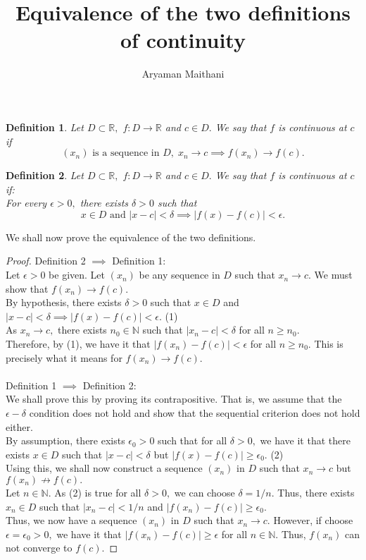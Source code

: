 \documentclass{article}
\title{Equivalence of the two definitions of continuity}
\author{Aryaman Maithani}
\date{}
\newtheorem{defn}{Definition}
\begin{document}
\maketitle

\hrulefill

\vspace{0.5cm}
\begin{defn}
	Let $D \subset \mathbb{R},$ $f:D\to\mathbb{R}$ and $c \in D.$ We say that $f$ is continuous at $c$ if
	\[(x_n) \text{ is a sequence in } D,\;x_n \to c \implies f(x_n) \to f(c).\]
\end{defn}
\begin{defn}
	Let $D \subset \mathbb{R},$ $f:D\to\mathbb{R}$ and $c \in D.$ We say that $f$ is continuous at $c$ if:\\
	For every $\epsilon > 0,$ there exists $\delta > 0$ such that
	\[x \in D \text{ and } |x - c| < \delta \implies |f(x) - f(c)| < \epsilon.\]
\end{defn}
We shall now prove the equivalence of the two definitions.\\
\begin{proof}
	Definition 2 $\implies$ Definition 1:\\
	Let $\epsilon > 0$ be given. Let $(x_n)$ be any sequence in $D$ such that $x_n \to c.$ We must show that $f(x_n) \to f(c).$\\
	By hypothesis, there exists $\delta > 0$ such that $x \in D$ and $|x - c| < \delta \implies |f(x) - f(c)| < \epsilon.$ \hfill (1)\\
	As $x_n \to c,$ there exists $n_0 \in \mathbb{N}$ such that $|x_n - c| < \delta$ for all $n \ge n_0.$\\
	Therefore, by (1), we have it that $|f(x_n) - f(c)| < \epsilon$ for all $n \ge n_0.$ This is precisely what it means for $f(x_n) \to f(c).$\\~\\
	Definition 1 $\implies$ Definition 2:\\
	We shall prove this by proving its contrapositive. That is, we assume that the $\epsilon-\delta$ condition does not hold and show that the sequential criterion does not hold either.\\
	By assumption, there exists $\epsilon_0 > 0$ such that for all $\delta > 0,$ we have it that there exists $x \in D$ such that $|x - c| < \delta$ but $|f(x) - f(c)| \ge \epsilon_0.$ \hfill (2)\\
	Using this, we shall now construct a sequence $(x_n)$ in $D$ such that $x_n \to c$ but $f(x_n) \not\to f(c).$\\
	Let $n \in \mathbb{N}.$ As (2) is true for all $\delta > 0,$ we can choose $\delta = 1/n.$ Thus, there exists $x_n \in D$ such that $|x_n - c| < 1/n$ and $|f(x_n) - f(c)| \ge \epsilon_0.$\\
	Thus, we now have a sequence $(x_n)$ in $D$ such that $x_n \to c.$ However, if choose $\epsilon = \epsilon_0 > 0,$ we have it that $|f(x_n) - f(c)| \ge \epsilon$ for all $n \in \mathbb{N}.$ Thus, $f(x_n)$ can not converge to $f(c).$
\end{proof}
\end{document}
